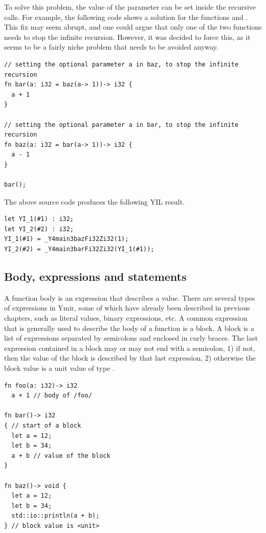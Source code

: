 To solve this problem, the value of the parameter  can be set inside
the recursive calls. For example, the following code shows a solution for the
functions  and . This fix may seem abrupt, and one could
argue that only one of the two functions needs to stop the infinite recursion.
However, it was decided to force this, as it seems to be a fairly niche problem
that needs to be avoided anyway.

\begin{lstlisting}[style=coloredverbatim]
// setting the optional parameter a in baz, to stop the infinite recursion
fn bar(a: i32 = baz(a-> 1))-> i32 {
  a + 1
}

// setting the optional parameter a in bar, to stop the infinite recursion
fn baz(a: i32 = bar(a-> 1))-> i32 {
  a - 1
}

bar();
\end{lstlisting}

The above source code produces the following YIL result.

\begin{lstlisting}[style=lyilVerb]
let YI_1(#1) : i32;
let YI_2(#2) : i32;
YI_1(#1) = _Y4main3bazFi32Zi32(1);
YI_2(#2) = _Y4main3barFi32Zi32(YI_1(#1));
\end{lstlisting}

\subsection{Body, expressions and statements}
\label{sec:global:function_body}

A function body is an expression that describes a value. There are several types
of expressions in Ymir, some of which have already been described in previous
chapters, such as literal values, binary expressions, etc. A common expression
that is generally used to describe the body of a function is a block. A block is
a list of expressions separated by semicolons and enclosed in curly braces. The
last expression contained in a block may or may not end with a semicolon, 1) if
not, then the value of the block is described by that last expression, 2)
otherwise the block value is a unit value of type .

\begin{lstlisting}[style=coloredverbatim]
fn foo(a: i32)-> i32
  a + 1 // body of /foo/

fn bar()-> i32
{ // start of a block
  let a = 12;
  let b = 34;
  a + b // value of the block
}

fn baz()-> void {
  let a = 12;
  let b = 34;
  std::io::println(a + b);
} // block value is <unit>

\end{lstlisting}

